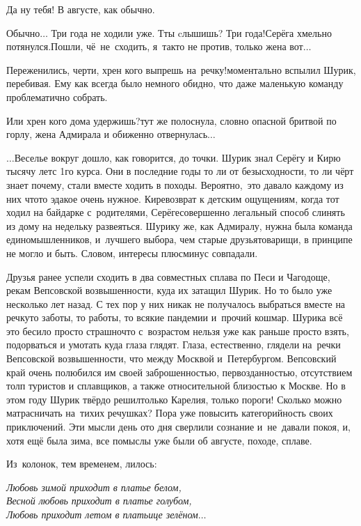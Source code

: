{\diagdash Да ну тебя! В августе, как обычно.

\diagdash Обычно$\ldots$ Три года не ходили уже. Т\sdash ты cлышишь? Три года!\mdash Серёга хмельно потянулся.\mdash Пошли, чё~не~сходить, я~так\sdash то не против, только жена вот$\ldots$

\diagdash Переженились, черти, хрен кого выпрешь на~речку!\mdash моментально вспылил Шурик, перебивая. Ему как всегда было немного обидно, что даже маленькую команду проблематично собрать.

\diagdash Или хрен кого дома удержишь?\mdash тут же полоснула, словно опасной бритвой по горлу, жена Адмирала и обиженно отвернулась$\ldots$ 

\vspace{0.5cm}
$\ldots$Веселье вокруг дошло, как говорится, до точки. Шурик знал Серёгу и Кирю тысячу лет\mdash с 1\sdash го курса. Они в последние годы то ли от безысходности, то ли чёрт знает почему, стали вместе ходить в походы. Вероятно,~это давало каждому из них что\sdash то эдакое очень нужное. Кире\mdash возврат к детским ощущениям, когда тот ходил на байдарке с~родителями, Серёге\mdash совершенно легальный способ слинять из дому на недельку развеяться. Шурику же, как Адмиралу, нужна была команда единомышленников, и~лучшего выбора, чем старые друзья\sdash товарищи, в принципе не могло и быть. Словом, интересы плюс\sdash минус совпадали. 

Друзья ранее успели сходить в два совместных сплава по Песи и Чагодоще, рекам Вепсовской возвышенности, куда их затащил Шурик. Но то было уже несколько лет назад. С тех пор у них никак не получалось выбраться вместе на речку\mdash то заботы, то работы, то всякие пандемии и~прочий кошмар. Шурика всё это бесило просто страшно\mdash что с~возрастом нельзя уже как раньше просто взять, подорваться и умотать куда глаза глядят. Глаза, естественно, глядели на~речки Вепсовской возвышенности, что между Москвой и~Петербургом. Вепсовский край очень полюбился им своей заброшенностью, первозданностью, отсутствием толп туристов и сплавщиков, а также относительной близостью к Москве. Но в этом году Шурик твёрдо решил\mdash только Карелия, только пороги! Сколько можно матрасничать на~тихих речушках? Пора уже повысить категорийность своих приключений. Эти мысли день ото дня сверлили сознание и~не~давали покоя, и, хотя ещё была зима, все помыслы уже были об августе, походе, сплаве.

\newpage
Из~колонок, тем временем, лилось:

\vspace{0.01cm}
\noindent\textit{%
	\hspace*{1.4cm}Любовь зимой приходит в платье белом,\\
	\hspace*{1.4cm}Весной любовь приходит в платье голубом,\\
	\hspace*{1.4cm}Любовь приходит летом в платьице зелёном$\ldots$
}
\vspace{0.01cm}

}

